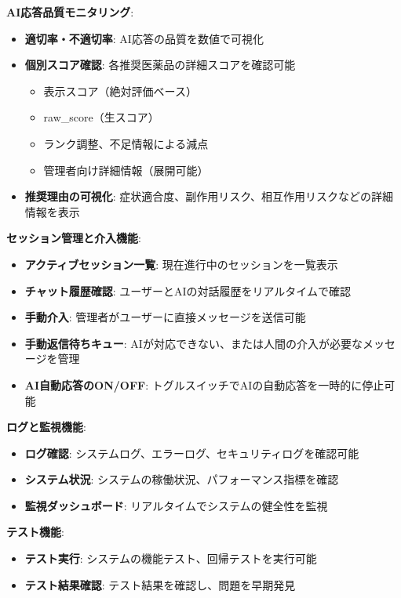 \documentclass[a4paper,11pt,ja=standard,xelatex]{bxjsarticle}
\theoremstyle{definition}
\begin{document}
\textbf{AI応答品質モニタリング}:
\begin{itemize}
\item \textbf{適切率・不適切率}: AI応答の品質を数値で可視化
\item \textbf{個別スコア確認}: 各推奨医薬品の詳細スコアを確認可能
  \begin{itemize}
  \item 表示スコア（絶対評価ベース）
  \item raw\_score（生スコア）
  \item ランク調整、不足情報による減点
  \item 管理者向け詳細情報（展開可能）
  \end{itemize}
\item \textbf{推奨理由の可視化}: 症状適合度、副作用リスク、相互作用リスクなどの詳細情報を表示
\end{itemize}

\textbf{セッション管理と介入機能}:
\begin{itemize}
\item \textbf{アクティブセッション一覧}: 現在進行中のセッションを一覧表示
\item \textbf{チャット履歴確認}: ユーザーとAIの対話履歴をリアルタイムで確認
\item \textbf{手動介入}: 管理者がユーザーに直接メッセージを送信可能
\item \textbf{手動返信待ちキュー}: AIが対応できない、または人間の介入が必要なメッセージを管理
\item \textbf{AI自動応答のON/OFF}: トグルスイッチでAIの自動応答を一時的に停止可能
\end{itemize}

\textbf{ログと監視機能}:
\begin{itemize}
\item \textbf{ログ確認}: システムログ、エラーログ、セキュリティログを確認可能
\item \textbf{システム状況}: システムの稼働状況、パフォーマンス指標を確認
\item \textbf{監視ダッシュボード}: リアルタイムでシステムの健全性を監視
\end{itemize}

\textbf{テスト機能}:
\begin{itemize}
\item \textbf{テスト実行}: システムの機能テスト、回帰テストを実行可能
\item \textbf{テスト結果確認}: テスト結果を確認し、問題を早期発見
\end{itemize}
\end{document}
